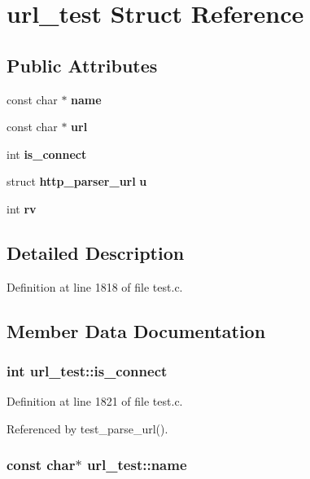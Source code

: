 \section{url\+\_\+test Struct Reference}
\label{structurl__test}
\subsection*{Public Attributes}
\begin{DoxyCompactItemize}
\item 
const char $\ast$ {\bf name}
\item 
const char $\ast$ {\bf url}
\item 
int {\bf is\+\_\+connect}
\item 
struct {\bf http\+\_\+parser\+\_\+url} {\bf u}
\item 
int {\bf rv}
\end{DoxyCompactItemize}


\subsection{Detailed Description}


Definition at line 1818 of file test.\+c.



\subsection{Member Data Documentation}
\subsubsection[{is\+\_\+connect}]{\setlength{\rightskip}{0pt plus 5cm}int url\+\_\+test\+::is\+\_\+connect}\label{structurl__test_a263382f06daa94c5b7bd6c8c604ed5cb}


Definition at line 1821 of file test.\+c.



Referenced by test\+\_\+parse\+\_\+url().

\subsubsection[{name}]{\setlength{\rightskip}{0pt plus 5cm}const char$\ast$ url\+\_\+test\+::name}\label{structurl__test_a25d5b11a4777eaeca702bdae4d2712f0}


